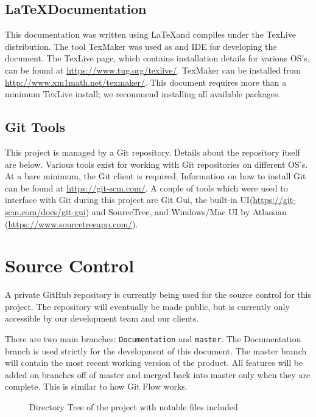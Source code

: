 \subsection{\LaTeX Documentation}
This documentation was written using \LaTeX and compiles under the TexLive distribution. The tool TexMaker was used as and IDE for developing the document.
The TexLive page, which contains installation details for various OS's, can be found at \url{https://www.tug.org/texlive/}. TexMaker can be installed from \url{http://www.xm1math.net/texmaker/}. This document requires more than a minimum TexLive install; we recommend installing all available packages.

\subsection{Git Tools}
This project is managed by a Git repository. Details about the repository itself are below. Various tools exist for working with Git repositories on different OS's. At a bare minimum, the Git client is required. Information on how to install Git can be found at \url{https://git-scm.com/}. A couple of tools which were used to interface with Git during this project are Git Gui, the built-in UI(\url{https://git-scm.com/docs/git-gui}) and SourceTree, and Windows/Mac UI by Atlassian (\url{https://www.sourcetreeapp.com/}).
\section{Source  Control}
A private GitHub repository is currently being used for the source control for this project. The repository will eventually be made public, but is currently only accessible by our development team and our clients.

There are two main branches: \lstinline|Documentation| and \lstinline|master|. The Documentation branch is used strictly for the development of this document. The master branch will contain the most recent working version of the product. All features will be added on branches off of master and merged back into master only when they are complete. This is similar to how Git Flow works.

\begin{figure}
\centering
\begin{subfigure}{0.3\textwidth}
\end{subfigure}
\caption{Directory Tree of the project with notable files included}
\label{fig:dirtree}
\end{figure}

